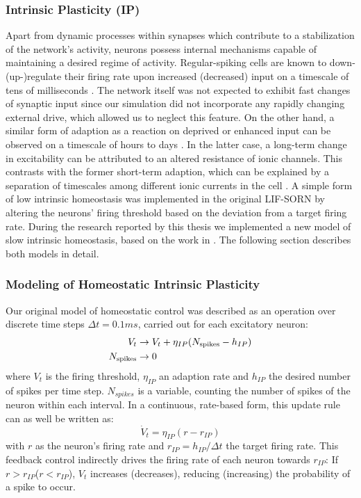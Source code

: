 \documentclass[10pt,a4paper]{article}
\begin{document}
\newpage


\subsubsection{Intrinsic Plasticity (IP)}

Apart from dynamic processes within synapses which contribute to a stabilization of the network's activity, neurons possess internal mechanisms capable of maintaining a desired regime of activity. Regular-spiking cells are known to down-(up-)regulate their firing rate upon increased (decreased) input on a timescale of tens of milliseconds \cite{Connors_Gutnick_Spike_Patterns,Benda_Herz_Spike_Frequ_Adaption}. The network itself was not expected to exhibit fast changes of synaptic input since our simulation did not incorporate any rapidly changing external drive, which allowed us to neglect this feature. On the other hand, a similar form of adaption as a reaction on deprived or enhanced input can be observed on a timescale of hours to days \cite{Desai_IP}. In the latter case, a long-term change in excitability can be attributed to an altered resistance of ionic channels. This contrasts with the former short-term adaption, which can be explained by a separation of timescales among different ionic currents in the cell \cite[p.~252--256]{Izhikevich_Dynsys}. A simple form of low intrinsic homeostasis was implemented in the original LIF-SORN by altering the neurons' firing threshold based on the deviation from a target firing rate. During the research reported by this thesis we implemented a new model of slow intrinsic homeostasis, based on the work in \cite{Sweeney_Paper}. The following section describes both models in detail.
\subsubsection{Modeling of Homeostatic Intrinsic Plasticity}
Our original model of homeostatic control was described as an operation over discrete time steps $\Delta t = 0.1ms$, carried out for each excitatory neuron:
\begin{align}
V_t &\rightarrow V_t + \eta_{IP} (N_{\rm spikes} - h_{IP}) \label{can_hom_1}\\
N_{\rm spikes} &\rightarrow 0 \label{can_hom_2}
\end{align}
where $V_t$ is the firing threshold, $\eta_{IP}$ an adaption rate and $h_{IP}$ the desired number of spikes per time step. $N_{spikes}$ is a variable, counting the number of spikes of the neuron within each interval. In a continuous, rate-based form, this update rule can as well be written as:
\begin{equation}
\dot{V}_t = \eta_{IP}(r-r_{IP}) \label{can_hom_rate}
\end{equation}
with $r$ as the neuron's firing rate and $r_{IP}=h_{IP}/\Delta t$ the target firing rate. This feedback control indirectly drives the firing rate of each neuron towards $r_{IP}$: If $r>r_{IP}$($r<r_{IP}$), $V_t$ increases (decreases), reducing (increasing) the probability of a spike to occur. 
\end{document}
